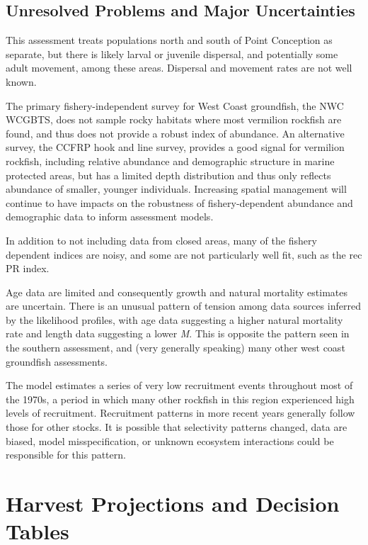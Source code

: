 \documentclass[
  english,
  a4paper,
]{article}
\begin{document}
\hypertarget{unresolved-problems-and-major-uncertainties-1}{%
\subsection{Unresolved Problems and Major Uncertainties}\label{unresolved-problems-and-major-uncertainties-1}}

This assessment treats populations north and south of Point Conception as separate, but there is likely larval or juvenile dispersal, and potentially some adult movement, among these areas. Dispersal and movement rates are not well known.

The primary fishery-independent survey for West Coast groundfish, the NWC WCGBTS, does not sample rocky habitats where most vermilion rockfish are found, and thus does not provide a robust index of abundance. An alternative survey, the CCFRP hook and line survey, provides a good signal for vermilion rockfish, including relative abundance and demographic structure in marine protected areas, but has a limited depth distribution and thus only reflects abundance of smaller, younger individuals. Increasing spatial management will continue to have impacts on the robustness of fishery-dependent abundance and demographic data to inform assessment models.

In addition to not including data from closed areas, many of the fishery dependent indices are noisy, and some are not particularly well fit, such as the rec PR index.

Age data are limited and consequently growth and natural mortality estimates are uncertain. There is an unusual pattern of tension among data sources inferred by the likelihood profiles, with age data suggesting a higher natural mortality rate and length data suggesting a lower \emph{M}. This is opposite the pattern seen in the southern assessment, and (very generally speaking) many other west coast groundfish assessments.

The model estimates a series of very low recruitment events throughout most of the 1970s, a period in which many other rockfish in this region experienced high levels of recruitment. Recruitment patterns in more recent years generally follow those for other stocks. It is possible that selectivity patterns changed, data are biased, model misspecification, or unknown ecosystem interactions could be responsible for this pattern.

\hypertarget{harvest-projections-and-decision-tables}{%
\section{Harvest Projections and Decision Tables}\label{harvest-projections-and-decision-tables}}
\end{document}
